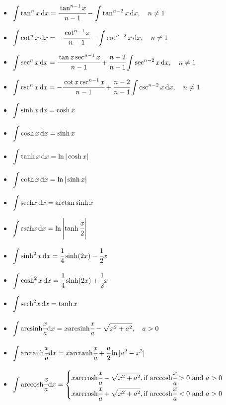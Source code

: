 \begin{itemize}
\item $ \displaystyle \int \tan^n x \, { { \text{d} } x} = \cfrac{\tan^{n-1} x }{n - 1} - \int \tan^{n-2} x \, { { \text{d} } x},\quad n \neq 1$
\item $ \displaystyle \int \cot^n x \, { { \text{d} } x} = -\cfrac{\cot^{n-1} x}{n - 1} - \int \cot^{n-2} x \, { { \text{d} } x},\quad n \neq 1$
\item $ \displaystyle \int \sec^n x \, { { \text{d} } x} = \cfrac{\tan x\sec^{n-1} x}{n - 1} + \cfrac{n-2}{n-1}\int \sec^{n-2} x \, { { \text{d} } x},\quad n \neq 1$
\item $ \displaystyle \int \csc^n x \, { { \text{d} } x} = -\cfrac{\cot x\csc^{n-1} x}{n - 1} + \cfrac{n-2}{n-1}\int \csc^{n-2} x \, { { \text{d} } x},\quad n \neq 1$
\item $ \displaystyle \int \sinh x \, { { \text{d} } x} = \cosh x$
\item $ \displaystyle \int \cosh x \, { { \text{d} } x} = \sinh x$
\item $ \displaystyle \int \tanh x \, { { \text{d} } x} = \ln \vert \cosh x \vert$
\item $ \displaystyle \int \coth x \, { { \text{d} } x} = \ln \vert \sinh x \vert$
\item $ \displaystyle \int { \mathop{\text{sech}} } x \, { { \text{d} } x} = { \mathop{\text{arctan}} } \sinh x $
\item $ \displaystyle \int { \mathop{\text{csch}} } x \, { { \text{d} } x} = \ln\left\vert\tanh \cfrac{x}{2} \right\vert$
\item $ \displaystyle \int \sinh^2 x \, { { \text{d} } x} = \cfrac{1}{4} \sinh (2x) - \cfrac{1}{2} x$
\item $ \displaystyle \int \cosh^2 x \, { { \text{d} } x} = \cfrac{1}{4} \sinh (2x) + \cfrac{1}{2} x$
\item $ \displaystyle \int { \mathop{\text{sech}} }^2 x \, { { \text{d} } x} = \tanh x$
\item $ \displaystyle \int { \mathop{\text{arcsinh}} } \cfrac{x}{a} { { \text{d} } x} = x { \mathop{\text{arcsinh}} } \cfrac{x}{a} - \sqrt{x^2 + a^2},\quad a > 0$
\item $ \displaystyle \int { \mathop{\text{arctanh}} } \cfrac{x}{a} { { \text{d} } x} = x { \mathop{\text{arctanh}} } \cfrac{x}{a} + \cfrac{a}{2} \ln\vert a^2 - x^2\vert$
\item $ \displaystyle \int { \mathop{\text{arccosh}} } \cfrac{x}{a} { { \text{d} } x} = 
  \begin{cases}
  \displaystyle x { \mathop{\text{arccosh}} } \cfrac{x}{a} - \sqrt{x^2 + a^2}, \text{if ${ \mathop{\text{arccosh}} } \cfrac{x}{a} > 0$ and $a > 0$} \\
  \displaystyle x { \mathop{\text{arccosh}} } \cfrac{x}{a} + \sqrt{x^2 + a^2}, \text{if ${ \mathop{\text{arccosh}} } \cfrac{x}{a} < 0$ and $a > 0$}
  \end{cases} $


\end{itemize}
